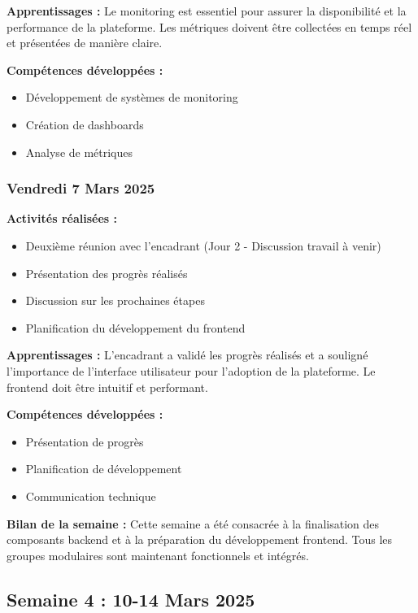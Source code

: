 \documentclass[12pt,a4paper]{article}
\begin{document}
\textbf{Apprentissages :}
Le monitoring est essentiel pour assurer la disponibilité et la performance de la plateforme. Les métriques doivent être collectées en temps réel et présentées de manière claire.

\textbf{Compétences développées :}
\begin{itemize}
    \item Développement de systèmes de monitoring
    \item Création de dashboards
    \item Analyse de métriques
\end{itemize}

\subsubsection{Vendredi 7 Mars 2025}
\textbf{Activités réalisées :}
\begin{itemize}
    \item Deuxième réunion avec l'encadrant (Jour 2 - Discussion travail à venir)
    \item Présentation des progrès réalisés
    \item Discussion sur les prochaines étapes
    \item Planification du développement du frontend
\end{itemize}

\textbf{Apprentissages :}
L'encadrant a validé les progrès réalisés et a souligné l'importance de l'interface utilisateur pour l'adoption de la plateforme. Le frontend doit être intuitif et performant.

\textbf{Compétences développées :}
\begin{itemize}
    \item Présentation de progrès
    \item Planification de développement
    \item Communication technique
\end{itemize}

\textbf{Bilan de la semaine :}
Cette semaine a été consacrée à la finalisation des composants backend et à la préparation du développement frontend. Tous les groupes modulaires sont maintenant fonctionnels et intégrés.

\clearpage
\subsection{Semaine 4 : 10-14 Mars 2025}
\end{document}
